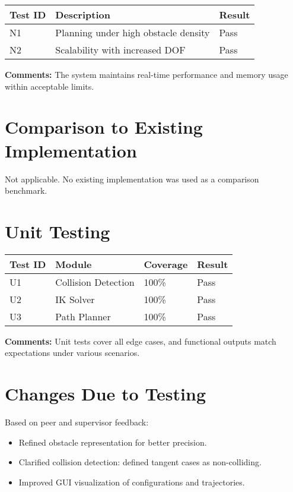 \documentclass[12pt, titlepage]{article}
\begin{document}
\begin{tabularx}{\textwidth}{l X l}
\toprule
\textbf{Test ID} & \textbf{Description} & \textbf{Result} \\
\midrule
N1 & Planning under high obstacle density & Pass \\
N2 & Scalability with increased DOF & Pass \\
\bottomrule
\end{tabularx}

\textbf{Comments:} The system maintains real-time performance and memory usage within acceptable limits.

\section{Comparison to Existing Implementation}

Not applicable. No existing implementation was used as a comparison benchmark.

\section{Unit Testing}

\begin{tabularx}{\textwidth}{l l l l}
\toprule
\textbf{Test ID} & \textbf{Module} & \textbf{Coverage} & \textbf{Result} \\
\midrule
U1 & Collision Detection & 100\% & Pass \\
U2 & IK Solver & 100\% & Pass \\
U3 & Path Planner & 100\% & Pass \\
\bottomrule
\end{tabularx}

\textbf{Comments:} Unit tests cover all edge cases, and functional outputs match expectations under various scenarios.

\section{Changes Due to Testing}

Based on peer and supervisor feedback:

\begin{itemize}
  \item Refined obstacle representation for better precision.
  \item Clarified collision detection: defined tangent cases as non-colliding.
  \item Improved GUI visualization of configurations and trajectories.
\end{itemize}
\end{document}
